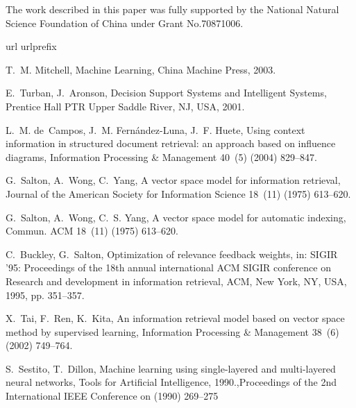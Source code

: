 \documentclass{elsarticle}
\begin{document}
The work described in this paper was fully supported by the National Natural
Science Foundation of China under Grant No.70871006.




%

\begin{thebibliography}{10}
\expandafter\ifx\csname url\endcsname\relax
  \def\url#1{\texttt{#1}}\fi
\expandafter\ifx\csname urlprefix\endcsname\relax\def\urlprefix{URL }\fi

T.~M. Mitchell, Machine Learning, China Machine Press, 2003.

E.~Turban, J.~Aronson, Decision Support Systems and Intelligent Systems,
  Prentice Hall PTR Upper Saddle River, NJ, USA, 2001.

L.~M. de~Campos, J.~M. Fern{\'a}ndez-Luna, J.~F. Huete,
  {Using context information in structured document
  retrieval: an approach based on influence diagrams}, Information Processing
  \& Management 40~(5) (2004) 829--847.


G.~Salton, A.~Wong, C.~Yang, A vector space model for information retrieval,
  Journal of the American Society for Information Science 18~(11) (1975)
  613--620.

G.~Salton, A.~Wong, C.~S. Yang, A vector space model for automatic indexing,
  Commun. ACM 18~(11) (1975) 613--620.

C.~Buckley, G.~Salton, Optimization of relevance feedback weights, in: SIGIR
  '95: Proceedings of the 18th annual international ACM SIGIR conference on
  Research and development in information retrieval, ACM, New York, NY, USA,
  1995, pp. 351--357.


X.~Tai, F.~Ren, K.~Kita,
 {An information retrieval model based on vector space
  method by supervised learning}, Information Processing \& Management 38~(6)
  (2002) 749--764.

S.~Sestito, T.~Dillon, Machine learning using single-layered and multi-layered
  neural networks, Tools for Artificial Intelligence, 1990.,Proceedings of the
  2nd International IEEE Conference on (1990) 269--275
 

\end{thebibliography}
\end{document}
